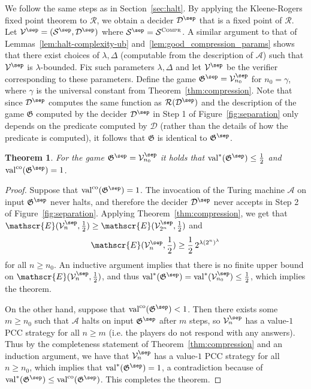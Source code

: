 \documentclass[11pt]{article}
\newtheorem{theorem}{Theorem}[section]
\theoremstyle{definition}
\newcommand{\val}{\ensuremath{\mathrm{val}}}
\newcommand{\valco}{\ensuremath{\mathrm{val}^{\mathrm{co}}}}
\newcommand{\game}{\mathfrak{G}}
\newcommand{\sampler}{\mathcal{S}}
\newcommand{\decider}{\mathcal{D}}
\newcommand{\verifier}{\mathcal{V}}
\newcommand{\Ent}{\mathscr{E}}
\newcommand{\compr}{\textsc{Compr}}
\renewcommand{\cal}[1]{\mathcal{#1}}
\newcommand{\notesendofpaper}{}
\begin{document}
We follow the same steps as in Section~\ref{sec:halt}.
By applying the Kleene-Rogers fixed point theorem to $\cal{R}$, we obtain a
decider $\decider^\sep$ that is a fixed point of $\cal{R}$.
Let $\verifier^\sep = (\sampler^\sep,\decider^\sep)$ where $\sampler^\sep =
\sampler^\compr$.
A similar argument to that of Lemmas~\ref{lem:halt-complexity-ub}
and~\ref{lem:good_compression_params} shows that there exist choices of
$\lambda, \Delta$ (computable from the description of $\cal{A}$) such that
$\verifier^\sep$ is $\lambda$-bounded.
Fix such parameters $\lambda, \Delta$ and let $\verifier^\sep$ be the verifier
corresponding to these parameters.
Define the game $\game^\sep = \verifier^\sep_{n_0}$ for $n_0 =\gamma$, where
$\gamma$ is the universal constant from Theorem~\ref{thm:compression}.
Note that since $\decider^\sep$ computes the same function as
$\cal{R}(\decider^\sep)$ and the description of the game $\game$ computed by the
decider $\decider^\sep$ in Step 1 of Figure~\ref{fig:separation} only depends on
the predicate computed by $\decider$ (rather than the details of how the
predicate is computed), it follows that $\game$ is identical to $\game^\sep$.

\begin{theorem}
  \label{thm:separation}
  For the game $\game^\sep = \verifier^\sep_{n_0}$ it holds that
  $\val^*(\game^\sep) \leq \frac{1}{2}$ and $\valco(\game^\sep) = 1$.
\end{theorem}
\begin{proof}
  Suppose that $\valco(\game^\sep) = 1$.
  The invocation of the Turing machine $\cal{A}$ on input $\game^\sep$ never
  halts, and therefore the decider $\decider^\sep$ never accepts in Step 2 of
  Figure~\ref{fig:separation}.
  Applying Theorem~\ref{thm:compression}, we get that
  $\Ent(\verifier^\sep_{n},\frac{1}{2}) \geq
  \Ent(\verifier^\sep_{2^n},\frac{1}{2})$ and
  \[
    \Ent(\verifier^\sep_n,\frac{1}{2}) \geq \frac{1}{2}\,
    2^{\lambda (2^n)^\lambda}
  \]
  for all $n \geq n_0$.
  An inductive argument implies that there is no finite upper bound on
  $\Ent(\verifier^\sep_{n},\frac{1}{2})$, and thus $\val^*(\game^\sep) =
  \val^*(\verifier^\sep_{n_0}) \leq \frac{1}{2}$, which implies the theorem.

  On the other hand, suppose that $\valco(\game^\sep) < 1$.
  Then there exists some $m \geq n_0$ such that $\cal{A}$ halts on input
  $\game^\sep$ after $m$ steps, so $\verifier^\sep_n$ has a value-$1$ PCC
  strategy for all $n \geq m$ (i.e.
  the players do not respond with any answers).
  Thus by the completeness statement of Theorem~\ref{thm:compression} and an
  induction argument, we have that $\verifier^\sep_n$ has a value-$1$ PCC
  strategy for all $n \geq n_0$, which implies that $\val^*(\game^\sep) = 1$, a
  contradiction because of $\val^*(\game^\sep) \leq \valco(\game^\sep)$.
  This completes the theorem.
\end{proof}



		


\notesendofpaper
\end{document}
